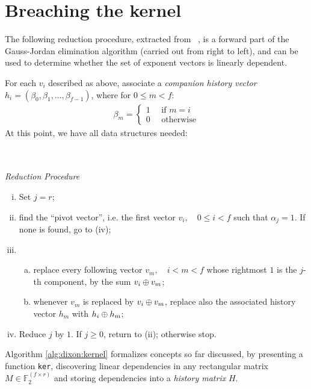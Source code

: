 \section{Breaching the kernel}

The following reduction procedure, extracted from ~\cite{morrison-brillhart}, is
a forward part of the Gauss-Jordan elimination algorithm (carried out from right
to left), and can be used to determine whether the set of exponent vectors is
linearly dependent.

For each $v_i$ described as above, associate a \emph{companion history vector}
$h_i = (\beta_0, \beta_1, \ldots, \beta_{f-1})$, where for $0 \leq m < f$:
\begin{align*}
  \beta_m = \begin{cases}
    1 \quad \text{ if $m = i$} \\
    0 \quad \text{ otherwise}
    \end{cases}
\end{align*}
At this point, we have all data structures needed:
\\
\\
\\

\begin{center}
  \emph{Reduction Procedure}
\end{center}
\begin{enumerate}[(i)]
  \item Set $j=r$;
  \item find the ``pivot vector'', i.e. the first vector
    $v_i, \quad 0 \leq i < f$ such that $\alpha_j = 1$. If none is found, go
    to (iv);
  \item
    \begin{enumerate}[(a)]
      \item replace every following vector $v_m, \quad i < m < f$
        whose rightmost $1$ is the $j$-th component, by the sum $v_i \oplus v_m$;
      \item whenever $v_m$ is replaced by $v_i \oplus v_m$, replace also the
        associated history vector $h_m$ with $h_i \oplus h_m$;
    \end{enumerate}
  \item Reduce $j$ by $1$. If $j \geq 0$, return to (ii); otherwise stop.
\end{enumerate}

Algorithm \ref{alg:dixon:kernel} formalizes concepts so far discussed, by
presenting a function \texttt{ker}, discovering linear dependencies in any
rectangular matrix $M \in \mathbb{F}_2^{(f \times r)}$
and storing dependencies into a \emph{history matrix} $H$.

